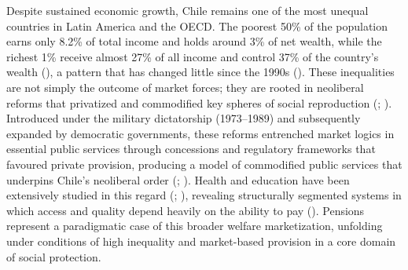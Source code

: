 \documentclass[
  12pt,
]{article}
\begin{document}
Despite sustained economic growth, Chile remains one of the most unequal
countries in Latin America and the OECD. The poorest 50\% of the
population earns only 8.2\% of total income and holds around 3\% of net
wealth, while the richest 1\% receive almost 27\% of all income and
control 37\% of the country's wealth
(), a pattern
that has changed little since the 1990s
(). These
inequalities are not simply the outcome of market forces; they are
rooted in neoliberal reforms that privatized and commodified key spheres
of social reproduction (;
). Introduced under the
military dictatorship (1973--1989) and subsequently expanded by
democratic governments, these reforms entrenched market logics in
essential public services through concessions and regulatory frameworks
that favoured private provision, producing a model of commodified public
services that underpins Chile's neoliberal order
(;
). Health and
education have been extensively studied in this regard
(;
), revealing structurally segmented systems in which access and
quality depend heavily on the ability to pay
().
Pensions represent a paradigmatic case of this broader welfare
marketization, unfolding under conditions of high inequality and
market-based provision in a core domain of social protection.
\end{document}
